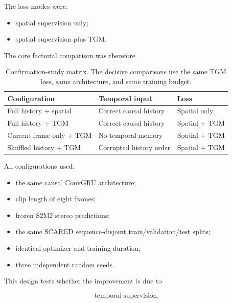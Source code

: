 \documentclass[11pt,a4paper]{article}
\begin{document}
The loss modes were:

\begin{itemize}[leftmargin=*]
    \item spatial supervision only;
    \item spatial supervision plus TGM.
\end{itemize}

The core factorial comparison was therefore

\begin{table}[h]
\centering
\caption{Confirmation-study matrix. The decisive comparisons use the same TGM loss,
same architecture, and same training budget.}
\small
\begin{tabular}{lll}
\toprule
\textbf{Configuration}
& \textbf{Temporal input}
& \textbf{Loss} \\
\midrule
Full history + spatial
& Correct causal history
& Spatial only \\

Full history + TGM
& Correct causal history
& Spatial + TGM \\

Current frame only + TGM
& No temporal memory
& Spatial + TGM \\

Shuffled history + TGM
& Corrupted history order
& Spatial + TGM \\
\bottomrule
\end{tabular}
\end{table}

All configurations used:

\begin{itemize}[leftmargin=*]
    \item the same causal ConvGRU architecture;
    \item clip length of eight frames;
    \item frozen S2M2 stereo predictions;
    \item the same SCARED sequence-disjoint train/validation/test splits;
    \item identical optimizer and training duration;
    \item three independent random seeds.
\end{itemize}

This design tests whether the improvement is due to

\begin{equation}
\text{temporal supervision},
\end{equation}
\end{document}
